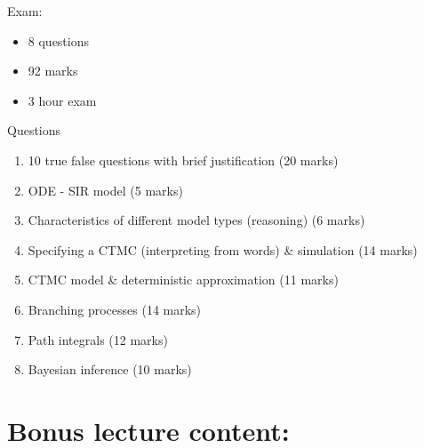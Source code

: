 \documentclass{X:/Documents/Coding/Latex/myassignment}
\begin{document}
Exam:
\begin{itemize}
    \item 8 questions
    \item 92 marks
    \item 3 hour exam
\end{itemize}
Questions
\begin{enumerate}
    \item 10 true false questions with brief justification (20 marks)
    \item ODE - SIR model (5 marks)
    \item Characteristics of different model types (reasoning) (6 marks)
    \item Specifying a CTMC (interpreting from words) \& simulation (14 marks)
    \item CTMC model \& deterministic approximation (11 marks)
    \item Branching processes (14 marks)
    \item Path integrals (12 marks)
    \item Bayesian inference (10 marks)
\end{enumerate}




\section{Bonus lecture content:}
\end{document}
